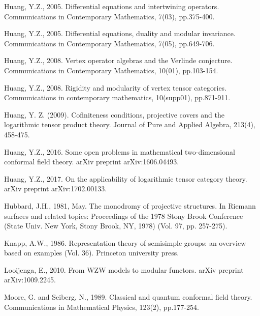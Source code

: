 \documentclass[11pt,b5paper,notitlepage]{article}
\theoremstyle{definition}
\theoremstyle{plain}
\numberwithin{equation}{section}
\begin{document}
\begin{thebibliography}{999999}
Huang, Y.Z., 2005. Differential equations and intertwining operators. Communications in Contemporary Mathematics, 7(03), pp.375-400.

Huang, Y.Z., 2005. Differential equations, duality and modular invariance. Communications in Contemporary Mathematics, 7(05), pp.649-706.

Huang, Y.Z., 2008. Vertex operator algebras and the Verlinde conjecture. Communications in Contemporary Mathematics, 10(01), pp.103-154.

Huang, Y.Z., 2008. Rigidity and modularity of vertex tensor categories. Communications in contemporary mathematics, 10(supp01), pp.871-911.

Huang, Y. Z. (2009). Cofiniteness conditions, projective covers and the logarithmic tensor product theory. Journal of Pure and Applied Algebra, 213(4), 458-475.

Huang, Y.Z., 2016. Some open problems in mathematical two-dimensional conformal field theory. arXiv preprint arXiv:1606.04493.

Huang, Y.Z., 2017. On the applicability of logarithmic tensor category theory. arXiv preprint arXiv:1702.00133.

Hubbard, J.H., 1981, May. The monodromy of projective structures. In Riemann surfaces and related topics: Proceedings of the 1978 Stony Brook Conference (State Univ. New York, Stony Brook, NY, 1978) (Vol. 97, pp. 257-275).
		



Knapp, A.W., 1986. Representation theory of semisimple groups: an overview based on examples (Vol. 36). Princeton university press.




Looijenga, E., 2010. From WZW models to modular functors. arXiv preprint arXiv:1009.2245.

Moore, G. and Seiberg, N., 1989. Classical and quantum conformal field theory. Communications in Mathematical Physics, 123(2), pp.177-254.



\end{thebibliography}
\end{document}
